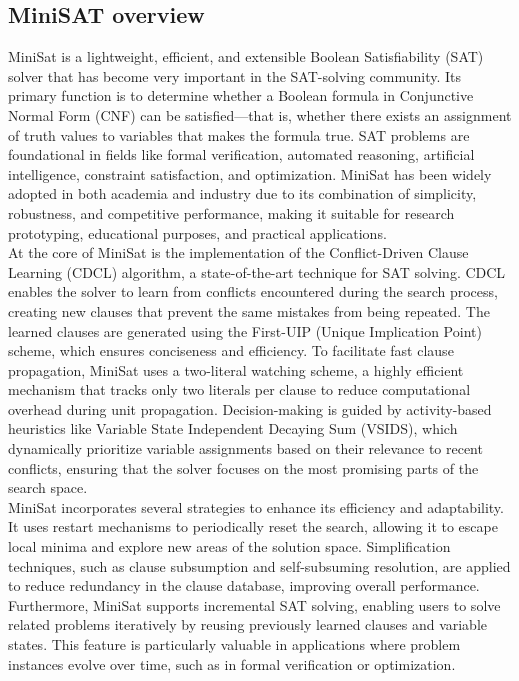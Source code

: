 \documentclass[runningheads]{llncs}
\begin{document}
\subsection{MiniSAT overview}
MiniSat is a lightweight, efficient, and extensible Boolean Satisfiability (SAT) solver that has become very important in the SAT-solving community. Its primary function is to determine whether a Boolean formula in Conjunctive Normal Form (CNF) can be satisfied—that is, whether there exists an assignment of truth values to variables that makes the formula true. SAT problems are foundational in fields like formal verification, automated reasoning, artificial intelligence, constraint satisfaction, and optimization. MiniSat has been widely adopted in both academia and industry due to its combination of simplicity, robustness, and competitive performance, making it suitable for research prototyping, educational purposes, and practical applications.
\\
At the core of MiniSat is the implementation of the Conflict-Driven Clause Learning (CDCL) algorithm, a state-of-the-art technique for SAT solving. CDCL enables the solver to learn from conflicts encountered during the search process, creating new clauses that prevent the same mistakes from being repeated. The learned clauses are generated using the First-UIP (Unique Implication Point) scheme, which ensures conciseness and efficiency. To facilitate fast clause propagation, MiniSat uses a two-literal watching scheme, a highly efficient mechanism that tracks only two literals per clause to reduce computational overhead during unit propagation. Decision-making is guided by activity-based heuristics like Variable State Independent Decaying Sum (VSIDS), which dynamically prioritize variable assignments based on their relevance to recent conflicts, ensuring that the solver focuses on the most promising parts of the search space.
\\
MiniSat incorporates several strategies to enhance its efficiency and adaptability. It uses restart mechanisms to periodically reset the search, allowing it to escape local minima and explore new areas of the solution space. Simplification techniques, such as clause subsumption and self-subsuming resolution, are applied to reduce redundancy in the clause database, improving overall performance. Furthermore, MiniSat supports incremental SAT solving, enabling users to solve related problems iteratively by reusing previously learned clauses and variable states. This feature is particularly valuable in applications where problem instances evolve over time, such as in formal verification or optimization.
\end{document}
